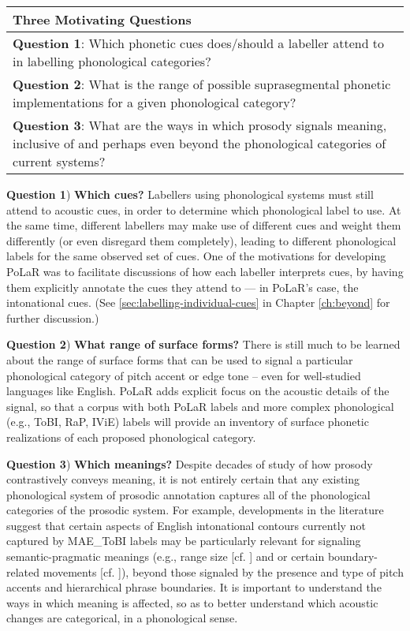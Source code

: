 \begin{center}
\renewcommand{\arraystretch}{1.5}
\begin{tabular}{>{\raggedright\arraybackslash}p{.85\linewidth}}
\textbf{Three Motivating Questions}\\
\hline
\textbf{Question 1}: Which phonetic cues does\slash should a labeller attend to in labelling phonological categories?\\
\textbf{Question 2}: What is the range of possible suprasegmental phonetic implementations for a given phonological category?\\
\textbf{Question 3}: What are the ways in which prosody signals meaning, inclusive of and perhaps even beyond the phonological categories of current systems?\\
\end{tabular}
\end{center}


\textbf{Question 1}) \textbf{Which cues?} Labellers using phonological systems must still attend to acoustic cues, in order to determine which phonological label to use. At the same time, different labellers may make use of different cues and weight them differently (or even disregard them completely), leading to different phonological labels for the same observed set of cues. One of the motivations for developing PoLaR was to facilitate discussions of how each labeller interprets cues, by having them explicitly annotate the cues they attend to — in PoLaR’s case, the intonational cues.  (See \ref{sec:labelling-individual-cues} in Chapter \ref{ch:beyond} for further discussion.)

\textbf{Question 2}) \textbf{What range of surface forms?} There is still much to be learned about the range of surface forms that can be used to signal a particular phonological category of pitch accent or edge tone – even for well-studied languages like English. PoLaR adds explicit focus on the acoustic details of the signal, so that a corpus with both PoLaR labels and more complex phonological (e.g., ToBI, RaP, IViE) labels will provide an inventory of surface phonetic realizations of each proposed phonological category.

\textbf{Question 3}) \textbf{Which meanings?} Despite decades of study of how prosody contrastively conveys meaning, it is not entirely certain that any existing phonological system of prosodic annotation captures all of the phonological categories of the prosodic system. For example, developments in the literature suggest that certain aspects of English intonational contours currently not captured by MAE\_ToBI labels may be particularly relevant for signaling semantic-pragmatic meanings (e.g., range size [cf. \citealt{ladd94}] and or certain boundary-related movements [cf. \citealt{ahn-16}]), beyond those signaled by the presence and type of pitch accents and hierarchical phrase boundaries. It is important to understand the ways in which meaning is affected, so as to better understand which acoustic changes are categorical, in a phonological sense.

